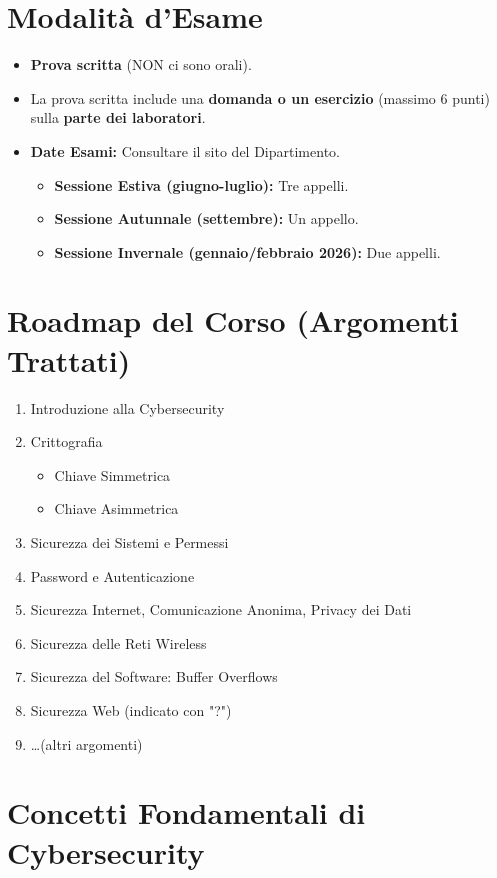 \section{Modalità d'Esame}
\begin{itemize}
    \item \textbf{Prova scritta} (NON ci sono orali).
    \item La prova scritta include una \textbf{domanda o un esercizio} (massimo 6 punti) sulla \textbf{parte dei laboratori}.
    \item \textbf{Date Esami:} Consultare il sito del Dipartimento.
    \begin{itemize}
        \item \textbf{Sessione Estiva (giugno-luglio):} Tre appelli.
        \item \textbf{Sessione Autunnale (settembre):} Un appello.
        \item \textbf{Sessione Invernale (gennaio/febbraio 2026):} Due appelli.
    \end{itemize}
\end{itemize}

\section{Roadmap del Corso (Argomenti Trattati)}
\begin{enumerate}
    \item Introduzione alla Cybersecurity
    \item Crittografia
    \begin{itemize}
        \item Chiave Simmetrica
        \item Chiave Asimmetrica
    \end{itemize}
    \item Sicurezza dei Sistemi e Permessi
    \item Password e Autenticazione
    \item Sicurezza Internet, Comunicazione Anonima, Privacy dei Dati
    \item Sicurezza delle Reti Wireless
    \item Sicurezza del Software: Buffer Overflows
    \item Sicurezza Web (indicato con "?")
    \item \dots (altri argomenti)
\end{enumerate}

\section{Concetti Fondamentali di Cybersecurity}

